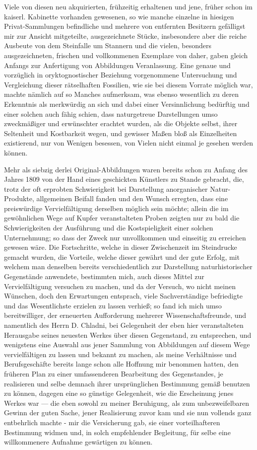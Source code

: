 \documentclass[a4paper, 11pt, oneside, german]{article}
\begin{document}
Viele von diesen neu akquirierten, frühzeitig erhaltenen und jene, früher schon im kaiserl. Kabinette vorhanden gewesenen, so wie manche einzelne in hiesigen Privat-Sammlungen befindliche und mehrere von entfernten Besitzern gefälligst mir zur Ansicht mitgeteilte, ausgezeichnete Stücke, insbesondere aber die reiche Ausbeute von dem Steinfalle um Stannern und die vielen, besonders ausgezeichneten, frischen und vollkommenen Exemplare von daher, gaben gleich Anfangs zur Anfertigung von Abbildungen Veranlassung. Eine genaue und vorzüglich in oryktognostischer Beziehung vorgenommene Untersuchung und Vergleichung dieser rätselhaften Fossilien, wie sie bei diesem Vorrate möglich war, machte nämlich auf so Manches aufmerksam, was ebenso wesentlich zu deren Erkenntnis als merkwürdig an sich und dabei einer Versinnlichung bedürftig und einer solchen auch fähig schien, dass naturgetreue Darstellungen umso zweckmäßiger und erwünschter erachtet wurden, als die Objekte selbst, ihrer Seltenheit und Kostbarkeit wegen, und gewisser Maßen bloß als Einzelheiten existierend, nur von Wenigen besessen, von Vielen nicht einmal je gesehen werden können.

Mehr als siebzig derlei Original-Abbildungen waren bereits schon zu Anfang des Jahres 1809 von der Hand eines geschickten Künstlers zu Stande gebracht, die, trotz der oft erprobten Schwierigkeit bei Darstellung anorganischer Natur-Produkte, allgemeinen Beifall fanden und den Wunsch erregten, dass eine preiswürdige Vervielfältigung derselben möglich sein möchte; allein die im gewöhnlichen Wege auf Kupfer veranstalteten Proben zeigten nur zu bald die Schwierigkeiten der Ausführung und die Kostspieligkeit einer solchen Unternehmung; so dass der Zweck nur unvollkommen und einseitig zu erreichen gewesen wäre. Die Fortschritte, welche in dieser Zwischenzeit im Steindrucke gemacht wurden, die Vorteile, welche dieser gewährt und der gute Erfolg, mit welchem man denselben bereits verschiedentlich zur Darstellung naturhistorischer Gegenstände anwendete, bestimmten mich, auch dieses Mittel zur Vervielfältigung versuchen zu machen, und da der Versuch, wo nicht meinen Wünschen, doch den Erwartungen entsprach, viele Sachverständige befriedigte und das Wesentlichste erzielen zu lassen verhieß; so fand ich mich umso bereitwilliger, der erneuerten Aufforderung mehrerer Wissenschaftsfreunde, und namentlich des Herrn D. Chladni, bei Gelegenheit der eben hier veranstalteten Herausgabe seines neuesten Werkes über diesen Gegenstand, zu entsprechen, und wenigstens eine Auswahl aus jener Sammlung von Abbildungen auf diesem Wege vervielfältigen zu lassen und bekannt zu machen, als meine Verhältnisse und Berufsgeschäfte bereits lange schon alle Hoffnung mir benommen hatten, den früheren Plan zu einer umfassenderen Bearbeitung des Gegenstandes, je realisieren und selbe demnach ihrer ursprünglichen Bestimmung gemäß benutzen zu können, dagegen eine so günstige Gelegenheit, wie die Erscheinung jenes Werkes war --- die eben sowohl zu meiner Beruhigung, als zum unbezweifelbaren Gewinn der guten Sache, jener Realisierung zuvor kam und sie nun vollends ganz entbehrlich machte - mir die Versicherung gab, sie einer vorteilhafteren Bestimmung widmen und, in solch empfehlender Begleitung, für selbe eine willkommenere Aufnahme gewärtigen zu können.
\end{document}
